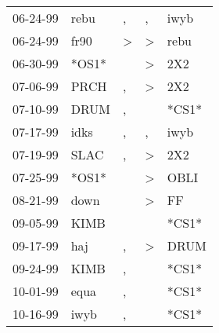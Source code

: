 \begin{supertabular}{p{0.07\textwidth}p{0.06\textwidth}p{0.02\textwidth}p{0.02\textwidth}p{0.06\textwidth}}
          06-24-99\textsuperscript{} &           rebu\textsuperscript{} &                , &                , &           iwyb\textsuperscript{} \\
          06-24-99\textsuperscript{} &           fr90\textsuperscript{} &     \textgreater &     \textgreater &           rebu\textsuperscript{} \\
          06-30-99\textsuperscript{} &                            *OS1* &                  &     \textgreater &            2X2\textsuperscript{} \\
          07-06-99\textsuperscript{} &           PRCH\textsuperscript{} &                , &     \textgreater &            2X2\textsuperscript{} \\
          07-10-99\textsuperscript{} &           DRUM\textsuperscript{} &                , &                  &                            *CS1* \\
          07-17-99\textsuperscript{} &           idks\textsuperscript{} &                , &                , &           iwyb\textsuperscript{} \\
          07-19-99\textsuperscript{} &           SLAC\textsuperscript{} &                , &     \textgreater &            2X2\textsuperscript{} \\
          07-25-99\textsuperscript{} &                            *OS1* &                  &     \textgreater &           OBLI\textsuperscript{} \\
          08-21-99\textsuperscript{} &           down\textsuperscript{} &                  &     \textgreater &             FF\textsuperscript{} \\
          09-05-99\textsuperscript{} &           KIMB\textsuperscript{} &                  &                  &                            *CS1* \\
          09-17-99\textsuperscript{} &            haj\textsuperscript{} &                , &     \textgreater &           DRUM\textsuperscript{} \\
          09-24-99\textsuperscript{} &           KIMB\textsuperscript{} &                , &                  &                            *CS1* \\
          10-01-99\textsuperscript{} &           equa\textsuperscript{} &                , &                  &                            *CS1* \\
          10-16-99\textsuperscript{} &           iwyb\textsuperscript{} &                , &                  &                            *CS1* \\

\end{supertabular}
